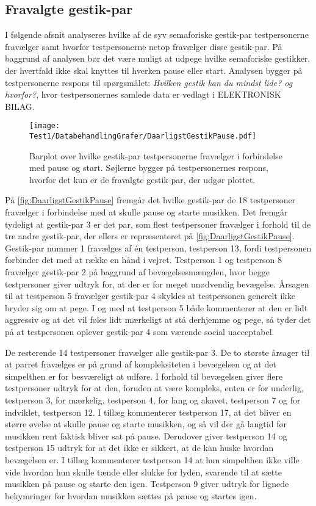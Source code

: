 \subsection{Fravalgte gestik-par}
\label{TestresultaterPauseStartDaarlig}
%
I følgende afsnit analyseres hvilke af de syv semaforiske gestik-par testpersonerne fravælger samt hvorfor testpersonerne netop fravælger disse gestik-par. På baggrund af analysen bør det være muligt at udpege hvilke semaforiske gestikker, der hvertfald ikke skal knyttes til hverken pause eller start. Analysen bygger på testpersonerne respons til spørgsmålet: \textit{Hvilken gestik kan du mindst lide? og hvorfor?}, hvor testpersonernes samlede data er vedlagt i ELEKTRONISK BILAG.
%
\begin{figure}[H]
	\centering
	\texttt{[image: Test1/DatabehandlingGrafer/DaarligstGestikPause.pdf]}
	\caption{Barplot over hvilke gestik-par testpersonerne fravælger i forbindelse med pause og start. Søjlerne bygger på testpersonernes respons, hvorfor det kun er de fravalgte gestik-par, der udgør plottet.}
	\label{fig:DaarligstGestikPause}
\end{figure}
\noindent
% 
På \autoref{fig:DaarligstGestikPause} fremgår det hvilke gestik-par de 18 testpersoner fravælger i forbindelse med at skulle pause og starte musikken. Det fremgår tydeligt at gestik-par 3 er det par, som flest testpersoner fravælger i forhold til de tre andre gestik-par, der ellers er repræsenteret på \autoref{fig:DaarligstGestikPause}. Gestik-par nummer 1 fravælges af én testperson, testperson 13, fordi testpersonen forbinder det med at række en hånd i vejret. Testperson 1 og testperson 8 fravælger gestik-par 2 på baggrund af bevægelsesmængden, hvor begge testpersoner giver udtryk for, at der er for meget unødvendig bevægelse. Årsagen til at testperson 5 fravælger gestik-par 4 skyldes at testpersonen generelt ikke bryder sig om at pege. I og med at testperson 5 både kommenterer at den er lidt aggressiv og at det vil føles lidt mærkeligt at stå derhjemme og pege, så tyder det på at testpersonen oplever gestik-par 4 som værende social uacceptabel. 

De resterende 14 testpersoner fravælger alle gestik-par 3. De to største årsager til at parret fravælges er på grund af kompleksiteten i bevægelsen og at det simpelthen er for besværeligt at udføre. I forhold til bevægelsen giver flere testpersoner udtryk for at den, foruden at være kompleks, enten er for underlig, testperson 3, for mærkelig, testperson 4, for lang og akavet, testperson 7 og for indviklet, testperson 12. I tillæg kommenterer testperson 17, at det bliver en større øvelse at skulle pause og starte musikken, og så vil der gå langtid før musikken rent faktisk bliver sat på pause. Derudover giver testperson 14 og testperson 15 udtryk for at det ikke er sikkert, at de kan huske hvordan bevægelsen er. I tillæg kommenterer testperson 14 at hun simpelthen ikke ville vide hvordan hun skulle tænde eller slukke for lyden, svarende til at sætte musikken på pause og starte den igen. Testperson 9 giver udtryk for lignede bekymringer for hvordan musikken sættes på pause og startes igen.

